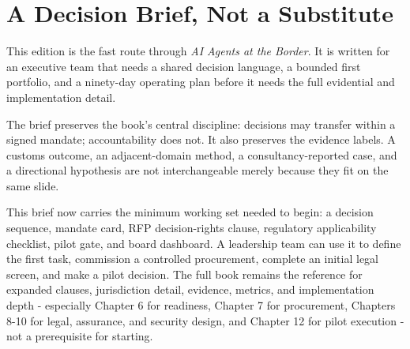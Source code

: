 \chapter*{A Decision Brief, Not a Substitute}

This edition is the fast route through \emph{AI Agents at the Border}.
It is written for an executive team that needs a shared decision language,
a bounded first portfolio, and a ninety-day operating plan before it needs
the full evidential and implementation detail.

The brief preserves the book's central discipline: decisions may transfer
within a signed mandate; accountability does not. It also preserves the
evidence labels. A customs outcome, an adjacent-domain method, a
consultancy-reported case, and a directional hypothesis are not
interchangeable merely because they fit on the same slide.

This brief now carries the minimum working set needed to begin: a decision
sequence, mandate card, RFP decision-rights clause, regulatory applicability
checklist, pilot gate, and board dashboard. A leadership team can use it to
define the first task, commission a controlled procurement, complete an
initial legal screen, and make a pilot decision. The full book remains the
reference for expanded clauses, jurisdiction detail, evidence, metrics, and
implementation depth - especially Chapter 6 for readiness, Chapter 7 for
procurement, Chapters 8-10 for legal, assurance, and security design, and
Chapter 12 for pilot execution - not a prerequisite for starting.

\clearpage
